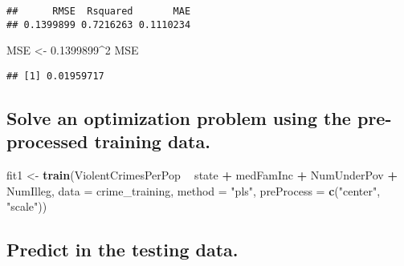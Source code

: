 \documentclass[]{article}
\newenvironment{Shaded}{\begin{snugshade}}{\end{snugshade}}
\newcommand{\KeywordTok}[1]{\textcolor[rgb]{0.13,0.29,0.53}{\textbf{#1}}}
\newcommand{\DataTypeTok}[1]{\textcolor[rgb]{0.13,0.29,0.53}{#1}}
\newcommand{\DecValTok}[1]{\textcolor[rgb]{0.00,0.00,0.81}{#1}}
\newcommand{\FloatTok}[1]{\textcolor[rgb]{0.00,0.00,0.81}{#1}}
\newcommand{\StringTok}[1]{\textcolor[rgb]{0.31,0.60,0.02}{#1}}
\newcommand{\OperatorTok}[1]{\textcolor[rgb]{0.81,0.36,0.00}{\textbf{#1}}}
\newcommand{\NormalTok}[1]{#1}
\begin{document}
\begin{Shaded}
\end{Shaded}

\begin{verbatim}
##      RMSE  Rsquared       MAE 
## 0.1399899 0.7216263 0.1110234
\end{verbatim}

\begin{Shaded}
\begin{Highlighting}[]
\NormalTok{MSE <-}\StringTok{ }\FloatTok{0.1399899}\OperatorTok{^}\DecValTok{2}
\NormalTok{MSE}
\end{Highlighting}
\end{Shaded}

\begin{verbatim}
## [1] 0.01959717
\end{verbatim}

\subsection{Solve an optimization problem using the pre-processed
training
data.}\label{solve-an-optimization-problem-using-the-pre-processed-training-data.-1}

\begin{Shaded}
\begin{Highlighting}[]
\NormalTok{fit1 <-}\StringTok{ }\KeywordTok{train}\NormalTok{(ViolentCrimesPerPop }\OperatorTok{~}\StringTok{ }\NormalTok{state }\OperatorTok{+}\StringTok{ }\NormalTok{medFamInc }\OperatorTok{+}\StringTok{ }\NormalTok{NumUnderPov }\OperatorTok{+}\StringTok{ }\NormalTok{NumIlleg, }\DataTypeTok{data =}\NormalTok{ crime_training, }\DataTypeTok{method =} \StringTok{"pls"}\NormalTok{, }\DataTypeTok{preProcess =} \KeywordTok{c}\NormalTok{(}\StringTok{"center"}\NormalTok{, }\StringTok{"scale"}\NormalTok{))}
\end{Highlighting}
\end{Shaded}

\subsection{Predict in the testing
data.}\label{predict-in-the-testing-data.-1}
\end{document}

